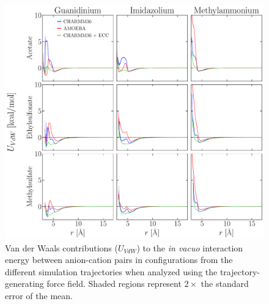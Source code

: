 \documentclass[journal=jacsat,articletitle=true,manuscript=suppinfo,layout=onecolumn]{achemso}
\begin{document}
    \begin{figure}[H]
    \begin{center}
        \includegraphics[width=1\columnwidth]{images/energy_conts_vdw.pdf}
        \caption{Van der Waals contributions ($U_{VdW}$) to the \emph{in vacuo} interaction energy between anion-cation pairs in configurations from the different simulation trajectories when analyzed using the trajectory-generating force field. Shaded regions represent $2\times$ the standard error of the mean.}
        \label{fig:energy_conts_vdw}
    \end{center}
    \end{figure}
\end{document}
